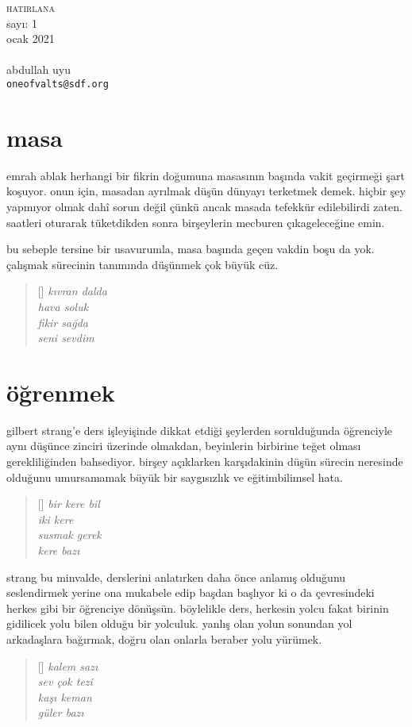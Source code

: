 \documentclass[9pt, a5paper, twocolumn, openright]{memoir}
\begin{document}
\thispagestyle{plain}
\noindent
{\HUGE\textsc{hatirlana}\\\small{}sayı: 1\\ocak 2021}\\\\
{\small{}abdullah uyu\\\texttt{oneofvalts@sdf.org}}
\bigskip
\section{masa}
emrah ablak herhangi bir fikrin doğumuna masasının başında vakit
geçirmeği şart koşuyor. onun için, masadan ayrılmak düşün dünyayı
terketmek demek. hiçbir şey yapmıyor olmak dahî sorun değil çünkü ancak
masada tefekkür edilebilirdi zaten. saatleri oturarak tüketdikden sonra
birşeylerin mecburen çıkageleceğine emin.

bu sebeple tersine bir usavurumla, masa başında geçen vakdin boşu da yok.
çalışmak sürecinin tanımında düşünmek çok büyük cüz.
\begin{verse}[\versewidth]
  \itshape{}
  kıvran dalda\\
  hava soluk\\
  fikir sağda\\
  seni sevdim
\end{verse}
\section{öğrenmek}
gilbert strang'e ders işleyişinde dikkat etdiği şeylerden sorulduğunda
öğrenciyle aynı düşünce zinciri üzerinde olmakdan, beyinlerin birbirine
teğet olması gerekliliğinden bahsediyor. birşey açıklarken karşıdakinin
düşün sürecin neresinde olduğunu umursamamak büyük bir saygısızlık ve
eğitimbilimsel hata.
\begin{verse}[\versewidth]
  \itshape{}
  bir kere bil\\
  iki kere\\
  susmak gerek\\
  kere bazı
\end{verse}
strang bu minvalde, derslerini anlatırken daha önce anlamış
olduğunu seslendirmek yerine ona mukabele edip başdan başlıyor ki o da
çevresindeki herkes gibi bir öğrenciye dönüşsün. böylelikle ders,
herkesin yolcu fakat birinin gidilicek yolu bilen olduğu bir yolculuk.
yanlış olan yolun sonundan yol arkadaşlara bağırmak, doğru olan onlarla
beraber yolu yürümek.
\begin{verse}[\versewidth]
  \itshape{}
  kalem sazı\\
  sev çok tezi\\
  kaşı keman\\
  güler bazı
\end{verse}
\end{document}
